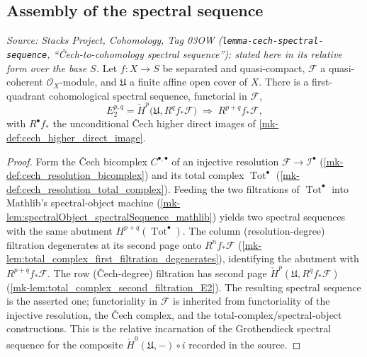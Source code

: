 \subsection{Assembly of the spectral sequence}

\begin{lemma}
  \label{mk-lem:cech_to_derived_pushforward_ss}
  \textit{Source: Stacks Project, Cohomology, Tag 03OW
  (\texttt{lemma-cech-spectral-sequence}, ``{\v C}ech-to-cohomology spectral
  sequence''); stated here in its relative form over the base \(S\).}
  Let \(f : X \to S\) be separated and quasi-compact, \(\mathcal{F}\) a quasi-coherent
  \(\mathcal{O}_X\)-module, and \(\mathfrak{U}\) a finite affine open cover of \(X\).
  There is a first-quadrant cohomological spectral sequence, functorial in
  \(\mathcal{F}\),
  \[
    E_2^{p,q} = \check{H}^p\bigl(\mathfrak{U}, R^q f_*\mathcal{F}\bigr)
    \;\Longrightarrow\; R^{p+q} f_*\mathcal{F},
  \]
  with \(R^\bullet f_*\) the unconditional {\v C}ech higher direct images of
  \ref{mk-def:cech_higher_direct_image}.
\end{lemma}
\begin{proof}
  Form the {\v C}ech bicomplex \(C^{\bullet,\bullet}\) of an injective resolution
  \(\mathcal{F} \to \mathcal{I}^\bullet\) (\ref{mk-def:cech_resolution_bicomplex}) and its
  total complex \(\operatorname{Tot}^\bullet\) (\ref{mk-def:cech_resolution_total_complex}).
  Feeding the two filtrations of \(\operatorname{Tot}^\bullet\) into Mathlib's
  spectral-object machine (\ref{mk-lem:spectralObject_spectralSequence_mathlib}) yields
  two spectral sequences with the same abutment
  \(H^{p+q}(\operatorname{Tot}^\bullet)\). The column (resolution-degree) filtration
  degenerates at its second page onto \(R^n f_*\mathcal{F}\)
  (\ref{mk-lem:total_complex_first_filtration_degenerates}), identifying the abutment with
  \(R^{p+q} f_*\mathcal{F}\). The row ({\v C}ech-degree) filtration has second page
  \(\check{H}^p(\mathfrak{U}, R^q f_*\mathcal{F})\)
  (\ref{mk-lem:total_complex_second_filtration_E2}). The resulting spectral sequence is
  the asserted one; functoriality in \(\mathcal{F}\) is inherited from functoriality of
  the injective resolution, the {\v C}ech complex, and the total-complex/spectral-object
  constructions. This is the relative incarnation of the Grothendieck spectral sequence
  for the composite \(\check{H}^0(\mathfrak{U}, -) \circ i\) recorded in the source.
\end{proof}

